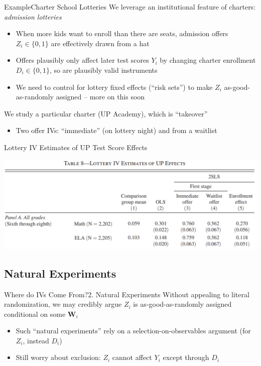 \documentclass{beamer}
\begin{document}
\begin{frame}{Example}{Charter School Lotteries}
We leverage an institutional feature of charters: \emph{admission lotteries}
\begin{itemize}
  \item When more kids want to enroll than there are seats, admission offers $Z_i\in\{0,1\}$ are effectively drawn from a hat

  \item Offers plausibly only affect later test scores $Y_i$ by changing charter enrollment $D_i\in\{0,1\}$, so are plausibly valid instruments

  \item We need to control for lottery fixed effects (``risk sets'') to make $Z_i$ as-good-as-randomly assigned -- more on this soon
\end{itemize}
\pause

We study a particular charter (UP Academy), which is ``takeover''
\begin{itemize}
  \item Two offer IVs: ``immediate'' (on lottery night) and from a waitlist
\end{itemize}

\end{frame}

\begin{frame}{Lottery IV Estimates of UP Test Score Effects}

\begin{center}
\includegraphics[scale=0.32]{./lecture_includes/charters1.png}
\end{center}

\end{frame}

\subsection{Natural Experiments}
\begin{frame}{Where do IVs Come From?}{2. Natural Experiments}
Without appealing to literal randomization, we may credibly argue $Z_i$ is as-good-as-randomly assigned conditional on some $\mathbf{W}_i$
\begin{itemize}
  \item Such ``natural experiments'' rely on a selection-on-observables argument (for $Z_i$, instead $D_i$)

  \item Still worry about exclusion: $Z_i$ cannot affect $Y_i$ except through $D_i$
\end{itemize}\pause\medskip
\end{frame}
\end{document}

